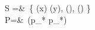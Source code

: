S =&\  
	\{ 
	{\mP(x)} \lor \lnot\mP(y), 
	{\lnot \mP(\ma)}, 
	{\mP(\mb)} 
	\} 
	\\
	P=&\ 
	({\colHi p_*} \lor \lnot p_*) \land {} 
